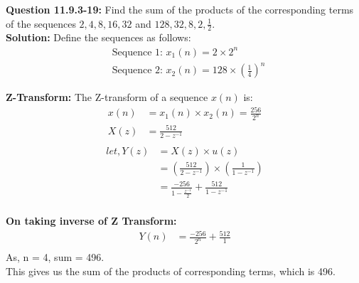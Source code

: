 \documentclass[journal,12pt,twocolumn]{IEEEtran}
\theoremstyle{remark}
\begin{document}
\title{}
\author{Sasa Mardi, EE23BTECH11222}
\date{}
\maketitle
\textbf{Question 11.9.3-19:} Find the sum of the products of the corresponding terms of the sequences $2, 4, 8, 16, 32$ and $128, 32, 8, 2, \frac{1}{2}$.\\
\textbf{Solution:}
Define the sequences as follows:\\
\begin{align}
&\text{Sequence 1: } x_1(n) = 2 \times 2^n \\
&\text{Sequence 2: } x_2(n) = 128 \times \left(\frac{1}{4}\right)^n
\end{align}

\textbf{Z-Transform:}
The Z-transform of a sequence \( x(n) \) is:
\begin{align}
x(n) &= x_1(n) \times x_2(n) = \frac{256}{2^{n}} \\
X(z) &= \frac{512}{2 - z^{-1}} \\
\end{align}
\begin{align}
 let, Y(z) &= X(z) \times u(z) \\
 &= \left(\frac{512}{2 - z^{-1}}\right) \times \left(\frac{1}{1 - z^{-1}}\right)\\
 &= \frac{-256}{1 - \frac{z^{-1}}{2}} + \frac{512}{1 - z^{-1}}\\
\end{align}

\textbf{On taking inverse of Z Transform:} \\
\begin{align}
Y(n) &= \frac{-256}{2^{n}} + \frac{512}{1} \\
\end{align}
As, n = 4, sum = 496. \\
This gives us the sum of the products of corresponding terms, which is 496.
\end{document}
